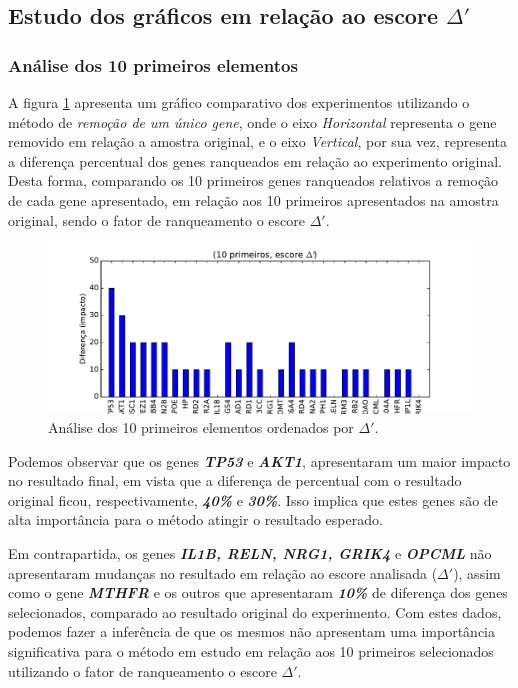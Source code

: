 \subsection{Estudo dos gráficos em relação ao escore $\Delta'$}
%
%
\subsubsection{Análise dos 10 primeiros elementos}
A figura \ref{fig_LOO_S_10} apresenta um gráfico comparativo dos experimentos utilizando o método de \textit{remoção de um único gene}, onde o eixo \textit{Horizontal} representa o gene removido em relação a amostra original, e o eixo \textit{Vertical}, por sua vez, representa a diferença percentual dos genes ranqueados em relação ao experimento original. Desta forma, comparando os 10 primeiros genes ranqueados relativos a remoção de cada gene apresentado, em relação aos 10 primeiros apresentados na amostra original, sendo o fator de ranqueamento o escore $\Delta'$.
%
\begin{figure}[ht!]
\centering
\includegraphics[width=\textwidth]{Images/analyses/fig_LOO_S_10.pdf}
\caption {Análise dos 10 primeiros elementos ordenados por $\Delta'$.
\label{fig_LOO_S_10}}
\end{figure}
%

Podemos observar que os genes \textbf{\textit{TP53}} e \textbf{\textit{AKT1}}, apresentaram um maior impacto no resultado final, em vista que a diferença de percentual com o resultado original ficou, respectivamente, \textbf{\textit{40\%}} e \textbf{\textit{30\%}}. Isso implica que estes genes são de alta importância para o método atingir o resultado esperado.
%

Em contrapartida, os genes \textbf{\textit{IL1B, RELN, NRG1, GRIK4}} e \textbf{\textit{OPCML}} não apresentaram mudanças no resultado em relação ao escore analisada ($\Delta'$), assim como o gene \textbf{\textit{MTHFR}} e os outros que apresentaram \textbf{\textit{10\%}} de diferença dos genes selecionados, comparado ao resultado original do experimento. Com estes dados, podemos fazer a inferência de que os mesmos não apresentam uma importância significativa para o método em estudo em relação aos 10 primeiros selecionados utilizando o fator de ranqueamento o escore $\Delta'$.
%

